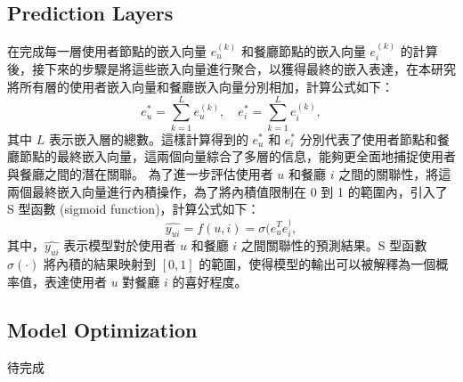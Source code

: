 \subsection{Prediction Layers}
    在完成每一層使用者節點的嵌入向量 $e_u^{(k)}$ 和餐廳節點的嵌入向量 $e_i^{(k)}$ 的計算後，接下來的步驟是將這些嵌入向量進行聚合，以獲得最終的嵌入表達，在本研究將所有層的使用者嵌入向量和餐廳嵌入向量分別相加，計算公式如下： 
    \begin{equation} 
        e_u^* = \sum_{k=1}^{L} e_u^{(k)}, \quad e_i^* = \sum_{k=1}^{L} e_i^{(k)}, 
    \end{equation} 
    其中 $L$ 表示嵌入層的總數。這樣計算得到的 $e_u^*$ 和 $e_i^*$ 分別代表了使用者節點和餐廳節點的最終嵌入向量，這兩個向量綜合了多層的信息，能夠更全面地捕捉使用者與餐廳之間的潛在關聯。
    為了進一步評估使用者 $u$ 和餐廳 $i$ 之間的關聯性，將這兩個最終嵌入向量進行內積操作，為了將內積值限制在 0 到 1 的範圍內，引入了 S 型函數 (sigmoid function)，計算公式如下： 
    \begin{equation} 
        \hat{y_{ui}} = f(u, i) = \sigma(e_u^{T} e_i^), 
    \end{equation} 
    其中，$\hat{y_{ui}}$ 表示模型對於使用者 $u$ 和餐廳 $i$ 之間關聯性的預測結果。S 型函數 $\sigma(\cdot)$ 將內積的結果映射到 $[0, 1]$ 的範圍，使得模型的輸出可以被解釋為一個概率值，表達使用者 $u$ 對餐廳 $i$ 的喜好程度。

\subsection{Model Optimization}
    待完成
